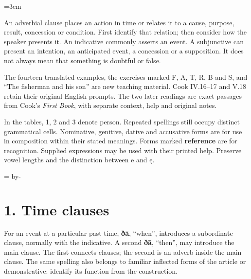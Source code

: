 \newcommand{\runningtitle}{Unit 11. Adverbial clauses}

\emergencystretch=3em
\newcommand{\itempara}[2]{\par\addvspace{3pt}\noindent\hangindent=1.8em\hangafter=1\makebox[1.8em][l]{#1.}#2\par}
\newcommand{\reserve}[1]{\par\penalty-100\begingroup\dimen0=\pagegoal\advance\dimen0 by-\pagetotal\ifdim\dimen0<#1\newpage\fi\endgroup}

\raggedright
{}

An adverbial clause places an action in time or relates it to a cause, purpose, result, concession or condition. First identify that relation; then consider how the speaker presents it. An indicative commonly asserts an event. A subjunctive can present an intention, an anticipated event, a concession or a supposition. It does not always mean that something is doubtful or false.

The fourteen translated examples, the exercises marked F, A, T, R, B and S, and “The fisherman and his son” are new teaching material. Cook IV.16–17 and V.18 retain their original English prompts. The two later readings are exact passages from Cook’s \emph{First Book}, with separate context, help and original notes.

In the tables, 1, 2 and 3 denote person. Repeated spellings still occupy distinct grammatical cells. Nominative, genitive, dative and accusative forms are for use in composition within their stated meanings. Forms marked \textbf{reference} are for recognition. Supplied expressions may be used with their printed help. Preserve vowel lengths and the distinction between e and ę.

\reserve{7\baselineskip}
\section*{1. Time clauses}

For an event at a particular past time, \textbf{ðā}, “when”, introduces a subordinate clause, normally with the indicative. A second \textbf{ðā}, “then”, may introduce the main clause. The first connects clauses; the second is an adverb inside the main clause. The same spelling also belongs to familiar inflected forms of the article or demonstrative: identify its function from the construction.

